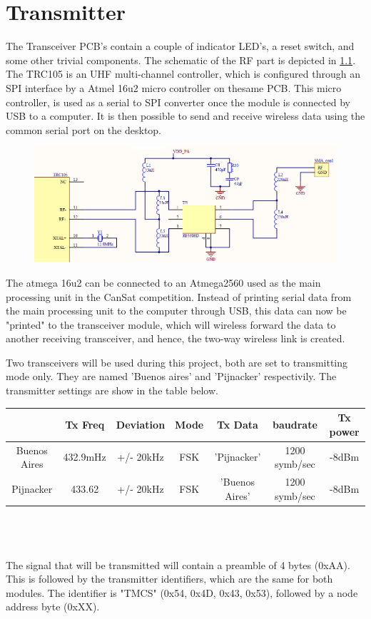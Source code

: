 \chapter{Transmitter}

The Transceiver PCB's contain a couple of indicator LED's, a reset switch, and some other trivial components. The schematic of the RF part is depicted in \ref{fig:RFschematic}. The TRC105 is an UHF multi-channel controller, which is configured through an SPI interface by a Atmel 16u2 micro controller on thesame PCB. This micro controller, is used as a serial to SPI converter once the module is connected by USB to a computer. It is then possible to send and receive wireless data using the common serial port on the desktop.    

\begin{figure}[h]
	\centering
	\includegraphics[width=0.7\linewidth]{"figures/RF schematic"}
	\caption[RF-schematic]{}
	\label{fig:RFschematic}
\end{figure}

The atmega 16u2 can be connected to an Atmega2560 used as the main processing unit in the CanSat competition. Instead of printing serial data from the main processing unit to the computer through USB, this data can now be "printed" to the transceiver module, which will wireless forward the data to another receiving transceiver, and hence, the two-way wireless link is created. 

Two transceivers will be used during this project, both are set to transmitting mode only. They are named 'Buenos aires' and 'Pijnacker' respectivily. The transmitter settings are show in the table below.\\

\begin{tabular}{|c|c|c|c|c|c|c|}
	\hline   & Tx Freq & Deviation & Mode & Tx Data & baudrate & Tx power \\ 
	\hline Buenos Aires & 432.9mHz & +/- 20kHz & FSK & 'Pijnacker' & 1200 symb/sec & -8dBm\\ 
	\hline Pijnacker & 433.62 & +/- 20kHz & FSK & 'Buenos Aires' & 1200 symb/sec & -8dBm\\ 
	\hline 
\end{tabular} 
\\\\\\
The signal that will be transmitted will contain a preamble of 4 bytes (0xAA).  This is followed by the transmitter identifiers, which are the same for both modules. The identifier is "TMCS" (0x54, 0x4D, 0x43, 0x53), followed by a node address byte (0xXX). 

